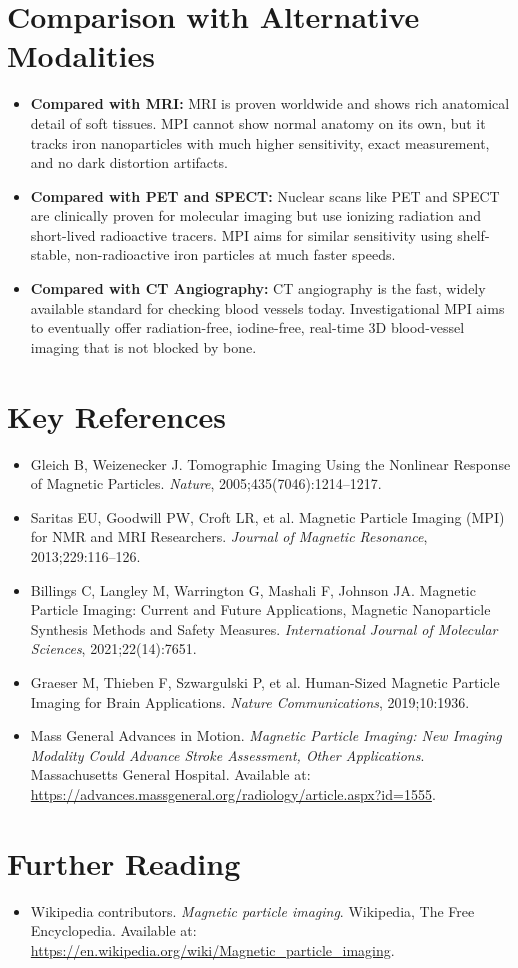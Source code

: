 \section{Comparison with Alternative Modalities}

\begin{itemize}
    \item \textbf{Compared with MRI:} MRI is proven worldwide and shows rich anatomical detail of soft tissues. MPI cannot show normal anatomy on its own, but it tracks iron nanoparticles with much higher sensitivity, exact measurement, and no dark distortion artifacts.
    \item \textbf{Compared with PET and SPECT:} Nuclear scans like PET and SPECT are clinically proven for molecular imaging but use ionizing radiation and short-lived radioactive tracers. MPI aims for similar sensitivity using shelf-stable, non-radioactive iron particles at much faster speeds.
    \item \textbf{Compared with CT Angiography:} CT angiography is the fast, widely available standard for checking blood vessels today. Investigational MPI aims to eventually offer radiation-free, iodine-free, real-time 3D blood-vessel imaging that is not blocked by bone.
\end{itemize}

\section{Key References}

\begin{itemize}
    \item Gleich B, Weizenecker J. Tomographic Imaging Using the Nonlinear Response of Magnetic Particles. \textit{Nature}, 2005;435(7046):1214--1217.
    \item Saritas EU, Goodwill PW, Croft LR, et al. Magnetic Particle Imaging (MPI) for NMR and MRI Researchers. \textit{Journal of Magnetic Resonance}, 2013;229:116--126.
    \item Billings C, Langley M, Warrington G, Mashali F, Johnson JA. Magnetic Particle Imaging: Current and Future Applications, Magnetic Nanoparticle Synthesis Methods and Safety Measures. \textit{International Journal of Molecular Sciences}, 2021;22(14):7651.
    \item Graeser M, Thieben F, Szwargulski P, et al. Human-Sized Magnetic Particle Imaging for Brain Applications. \textit{Nature Communications}, 2019;10:1936.
    \item Mass General Advances in Motion. \textit{Magnetic Particle Imaging: New Imaging Modality Could Advance Stroke Assessment, Other Applications}. Massachusetts General Hospital. Available at: \url{https://advances.massgeneral.org/radiology/article.aspx?id=1555}.
\end{itemize}

\section{Further Reading}
\begin{itemize}
  \item Wikipedia contributors. \textit{Magnetic particle imaging}. Wikipedia, The Free Encyclopedia. Available at: \url{https://en.wikipedia.org/wiki/Magnetic_particle_imaging}.
\end{itemize}
